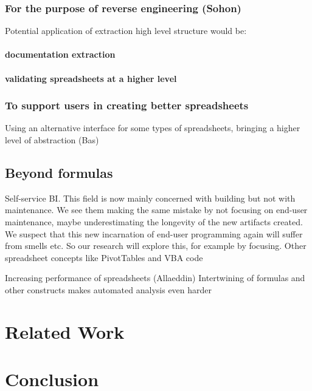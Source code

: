 \documentclass[conference]{IEEEtran}
\begin{document}
\subsubsection{For the purpose of reverse engineering (Sohon)}
Potential application of extraction high level structure would be:
\paragraph{documentation extraction}
\paragraph{validating spreadsheets at a higher level}

\subsubsection{To support users in creating better spreadsheets}
Using  an alternative interface for some types of spreadsheets, bringing a higher level of abstraction (Bas)

\subsection{Beyond formulas}

  Self-service BI. This field is now mainly concerned with building but not with maintenance. We see them making the same mistake by not focusing on end-user maintenance, maybe underestimating the longevity of the new artifacts created. We suspect that this new incarnation of end-user programming again will suffer from smells etc. So our research will explore this, for example by focusing. Other spreadsheet concepts like PivotTables and VBA code
  

Increasing performance of spreadsheets (Allaeddin)
Intertwining of formulas and other constructs makes automated analysis even harder


\section{Related Work}

\section{Conclusion}













\end{document}
